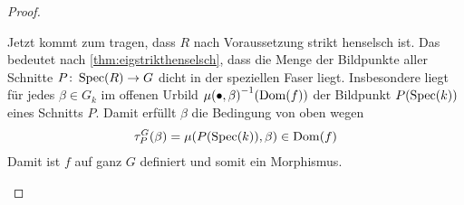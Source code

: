 \begin{Lemma}
\begin{proof}
\begin{description}
      Jetzt kommt zum tragen, dass $R$ nach Voraussetzung strikt
      henselsch ist. Das bedeutet nach
      \ref{thm:eigstrikthenselsch}, dass die Menge der Bildpunkte
      aller Schnitte ${P\colon\operatorname{Spec}(R)\to G}$ dicht in der
      speziellen Faser liegt.
      Insbesondere liegt für jedes $\beta\in G_k$ im offenen Urbild
      ${\mu(\bullet,\beta)}^{-1}(\operatorname{Dom}(f))$ der Bildpunkt $P(\operatorname{Spec}(k))$
      eines Schnitts $P$. Damit erfüllt $\beta$ die Bedingung von oben
      wegen
      \begin{gather*}
        \tau_P^G(\beta)=\mu(P(\operatorname{Spec}(k)),\beta)\in\operatorname{Dom}(f)
      \end{gather*}
      Damit ist $f$ auf ganz $G$ definiert und somit ein Morphismus.
      \qedhere
    \end{description}
  \end{proof}
\end{Lemma}


